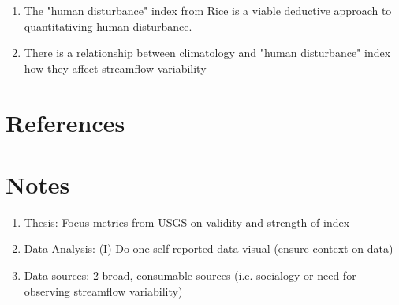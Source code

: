 \documentclass{article}
\begin{document}
    \begin{enumerate}
        \item The "human disturbance" index from Rice is a viable deductive approach to quantitativing human disturbance. 
        \item There is a relationship  between climatology and "human disturbance" index how they affect streamflow variability 
    \end{enumerate}

\section{References}

\section{Notes}

    \begin{enumerate}
        \item Thesis: Focus metrics from USGS on validity and strength of index
        \item Data Analysis: (I) Do one self-reported data visual (ensure context on data)
        \item Data sources: 2 broad, consumable sources (i.e. socialogy or need for observing streamflow variability)

    \end{enumerate}
\end{document}
